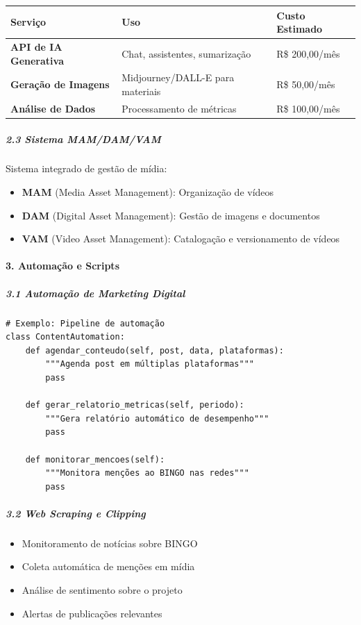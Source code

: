\bigskip\noindent
\begin{tabular}{p{}p{}p{}}
\toprule
Serviço & Uso & Custo Estimado \\
\hline
\textbf{API de IA Generativa} & Chat, assistentes, sumarização & R\$ 200,00/mês \\
\textbf{Geração de Imagens} & Midjourney/DALL-E para materiais & R\$ 50,00/mês \\
\textbf{Análise de Dados} & Processamento de métricas & R\$ 100,00/mês \\
\bottomrule
\end{tabular}

\bigskip

\subparagraph{2.3 Sistema MAM/DAM/VAM}

Sistema integrado de gestão de mídia:

\begin{itemize}
\item \textbf{MAM} (Media Asset Management): Organização de vídeos
\item \textbf{DAM} (Digital Asset Management): Gestão de imagens e documentos
\item \textbf{VAM} (Video Asset Management): Catalogação e versionamento de vídeos
\end{itemize}

\paragraph{3. Automação e Scripts}

\subparagraph{3.1 Automação de Marketing Digital}

\begin{verbatim}
# Exemplo: Pipeline de automação
class ContentAutomation:
    def agendar_conteudo(self, post, data, plataformas):
        """Agenda post em múltiplas plataformas"""
        pass
    
    def gerar_relatorio_metricas(self, periodo):
        """Gera relatório automático de desempenho"""
        pass
    
    def monitorar_mencoes(self):
        """Monitora menções ao BINGO nas redes"""
        pass
\end{verbatim}

\subparagraph{3.2 Web Scraping e Clipping}

\begin{itemize}
\item Monitoramento de notícias sobre BINGO
\item Coleta automática de menções em mídia
\item Análise de sentimento sobre o projeto
\item Alertas de publicações relevantes
\end{itemize}

